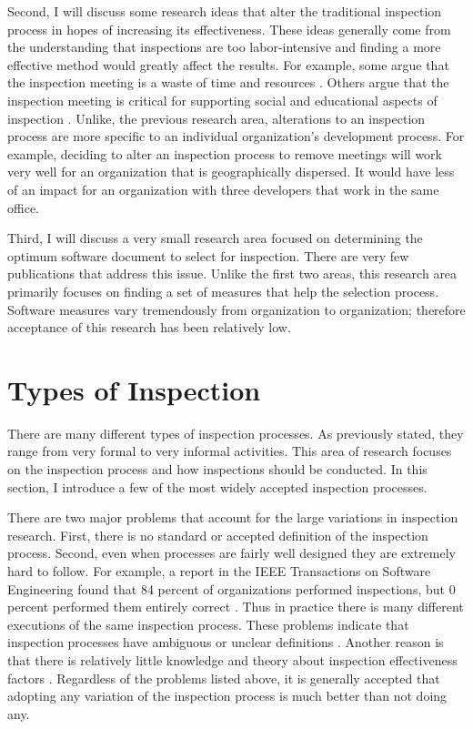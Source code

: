 Second, I will discuss some research ideas that alter the traditional
inspection process in hopes of increasing its effectiveness.  These ideas
generally come from the understanding that inspections are too
labor-intensive and finding a more effective method would greatly affect
the results. For example, some argue that the inspection meeting is a waste
of time and resources \cite{Johnson97, Votta93}. Others argue that the
inspection meeting is critical for supporting social and educational
aspects of inspection \cite{Gilb98, Gilb99, Johnson98, Johnson98a}. Unlike,
the previous research area, alterations to an inspection process are more
specific to an individual organization's development process. For example,
deciding to alter an inspection process to remove meetings will work very
well for an organization that is geographically dispersed. It would have
less of an impact for an organization with three developers that work in
the same office. 

Third, I will discuss a very small research area focused on determining the
optimum software document to select for inspection. There are very few
publications that address this issue. Unlike the first two areas, this
research area primarily focuses on finding a set of measures that help the
selection process. Software measures vary tremendously from organization to
organization; therefore acceptance of this research has been relatively
low.


\section{Types of Inspection}
There are many different types of inspection processes. As previously
stated, they range from very formal to very informal activities.  This area
of research focuses on the inspection process and how inspections should be
conducted. In this section, I introduce a few of the most widely accepted
inspection processes.

There are two major problems that account for the large variations in
inspection research. First, there is no standard or accepted definition of
the inspection process. Second, even when processes are fairly well
designed they are extremely hard to follow. For example, a report in the
IEEE Transactions on Software Engineering found that 84 percent of
organizations performed inspections, but 0 percent performed them entirely
correct \cite{Bisant89}. Thus in practice there is many different
executions of the same inspection process. These problems indicate that
inspection processes have ambiguous or unclear definitions
\cite{csdl-95-08}. Another reason is that there is relatively little
knowledge and theory about inspection effectiveness factors \cite{Ebenau94,
  csdl-95-08}. Regardless of the problems listed above, it is generally
accepted that adopting any variation of the inspection process is much
better than not doing any.

